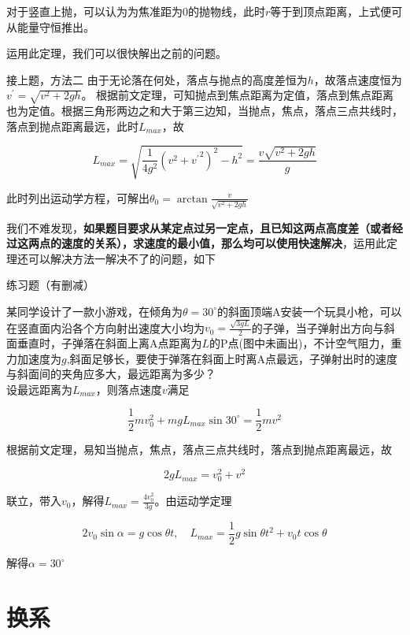 对于竖直上抛，可以认为为焦准距为$0$的抛物线，此时$r$等于到顶点距离，上式便可从能量守恒推出。

运用此定理，我们可以很快解出之前的问题。

\begin{ep}{接上题，方法二}{}
由于无论落在何处，落点与抛点的高度差恒为$h$，故落点速度恒为$v^{\prime} = \sqrt{v^2 + 2gh}$。
根据前文定理，可知抛点到焦点距离为定值，落点到焦点距离也为定值。根据三角形两边之和大于第三边知，当抛点，焦点，落点三点共线时，落点到抛点距离最远，此时$L_{max}$，故

$$L_{max} = \sqrt{\frac{1}{4g^2} (v^2 + {v^{\prime}}^2)^2 - h^2} = \frac{v\sqrt{v^2 + 2gh}}{g}$$

此时列出运动学方程，可解出$\theta_0 = \arctan{\frac{v}{\sqrt{v^2 + 2gh}}}$
\end{ep}

我们不难发现，\textbf{如果题目要求从某定点过另一定点，且已知这两点高度差（或者经过这两点的速度的关系），求速度的最小值，那么均可以使用快速解决}，运用此定理还可以解决方法一解决不了的问题，如下

\begin{ep}{练习题（有删减）}{}



某同学设计了一款小游戏，在倾角为$\theta = 30^{\circ}$的斜面顶端A安装一个玩具小枪，可以在竖直面内沿各个方向射出速度大小均为$v_0 = \frac{\sqrt{3gL}}{2}$的子弹，当子弹射出方向与斜面垂直时，子弹落在斜面上离A点距离为$L$的P点(图中未画出)，不计空气阻力，重力加速度为$g$,斜面足够长，要使于弹落在斜面上时离A点最远，子弹射出时的速度与斜面间的夹角应多大，最远距离为多少？
~\\

设最远距离为$L_{max}$，则落点速度$v$满足

$$\frac{1}{2} m v_0^2 + mgL_{max} \sin 30^{\circ} = \frac{1}{2} m v^2$$

根据前文定理，易知当抛点，焦点，落点三点共线时，落点到抛点距离最远，故

$$2gL_{max} = v_0^2 + v^2$$

联立，带入$v_0$，解得$L_{max} = \frac{4 v_0^2}{3g}$。由运动学定理

$$2 v_0 \sin \alpha = g \cos \theta t ,\quad L_{max} = \frac{1}{2} g \sin \theta t^2 + v_0 t \cos \theta$$

解得$\alpha = 30^{\circ}$

\end{ep}

\section{换系}

